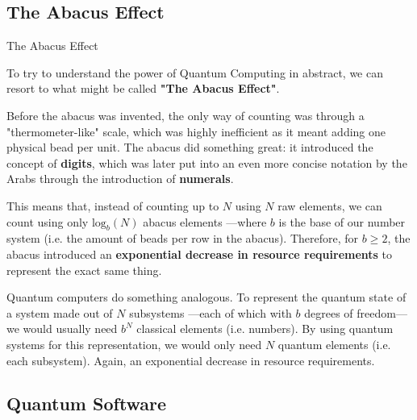 \documentclass[9pt, handout, aspectratio=169]{beamer}		%
\begin{document}

	\subsection{The Abacus Effect}

	\begin{frame}{The Abacus Effect}

		To try to understand the power of Quantum Computing in abstract, we can resort to what might be called \textbf{"The Abacus Effect"}.

		\medskip

		Before the abacus was invented, the only way of counting was through a "thermometer-like" scale, which was highly inefficient as it meant adding one physical bead per unit. The abacus did something great: it introduced the concept of \textbf{digits}, which was later put into an even more concise notation by the Arabs through the introduction of \textbf{numerals}.

		\medskip

		This means that, instead of counting up to $N$ using $N$ raw elements, we can count using only $\text{log}_b (N)$ abacus elements ---where $b$ is the base of our number system (i.e. the amount of beads per row in the abacus). Therefore, for $b\geq2$, the abacus introduced an \textbf{exponential decrease in resource requirements} to represent the exact same thing.

		\medskip

		Quantum computers do something analogous. To represent the quantum state of a system made out of $N$ subsystems ---each of which with $b$ degrees of freedom--- we would usually need $b^N$ classical elements (i.e. numbers). By using quantum systems for this representation, we would only need $N$ quantum elements (i.e. each subsystem). Again, an exponential decrease in resource requirements.

	\end{frame}


	\subsection{Quantum Software}
\end{document}
